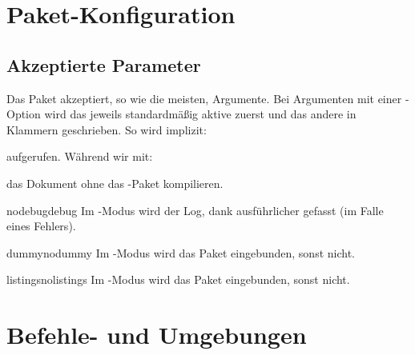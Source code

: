 \documentclass{sopra-base}
\begin{document}
\section{Paket-Konfiguration}    
    \subsection{Akzeptierte Parameter}
    Das Paket akzeptiert, so wie die meisten, Argumente. 
    Bei Argumenten mit einer -Option wird das jeweils standardmäßig aktive zuerst und das andere in Klammern
    geschrieben. So wird implizit:
\begin{plainlatex}
    \usepackage[nodebug,dummy,listings]{sopra-documentation}
\end{plainlatex}
    aufgerufen. Während wir mit:
\begin{plainlatex}
    \usepackage[nolistings]{sopra-documentation}
\end{plainlatex}
    das Dokument ohne das -Paket kompilieren.

    \begin{argument}{nodebug}{debug}
        \label{mrk:debug}Im -Modus wird der Log, dank  ausführlicher gefasst (im Falle eines Fehlers).
    \end{argument}

    \begin{argument}{dummy}{nodummy}
        \label{mrk:nodummy}Im -Modus wird das Paket  eingebunden, sonst nicht.
    \end{argument}

    \begin{argument}{listings}{nolistings}
        \label{mrk:nolistings}Im -Modus wird das Paket  eingebunden, sonst nicht.
    \end{argument}

%
%
%
%

\section{Befehle- und Umgebungen}
\end{document}
